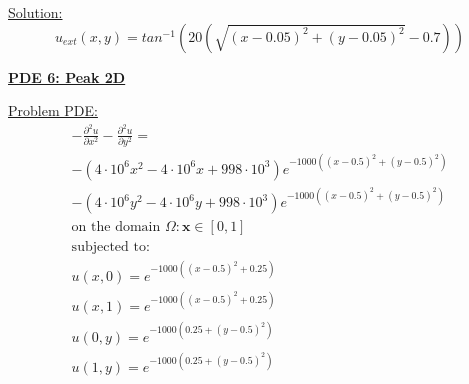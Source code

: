 \documentclass[.\jobname.tex]{subfiles}
\begin{document}
\underline{Solution:}
\begin{equation}
\label{eq:sol5}
u_{ext}(x,y) = tan^{-1}\left(20 \left(\sqrt{(x-0.05)^2 + (y-0.05)^2} -0.7\right)\right)
\end{equation}



\begin{figure}[H]
	\centering
	\noindent{}
	\label{fig:sol_plot_5}
\end{figure}




\newpage




\underline{\textbf{PDE 6: Peak 2D}} 

\underline{Problem PDE:}
\begin{equation}
\label{eq:pde6}
\begin{split}
-\frac{\partial^2 u}{\partial x^2} - \frac{\partial^2 u}{\partial y^2} = \\
-(4 \cdot 10^6 x^2 -4 \cdot 10^6 x + 998 \cdot 10^3)e^{-1000((x-0.5)^2 + (y-0.5)^2)} \\
-(4 \cdot 10^6 y^2 -4 \cdot 10^6 y + 998 \cdot 10^3)e^{-1000((x-0.5)^2 + (y-0.5)^2)} \\
\text{on the domain } \Omega: \mathbf{x} \in [0,1] \\
\text{subjected to: } \\
u(x,0) = e^{-1000((x-0.5)^{2} + 0.25)} \\
u(x,1) = e^{-1000((x-0.5)^{2} + 0.25)} \\
u(0,y) = e^{-1000(0.25 + (y-0.5)^{2})} \\
u(1,y) = e^{-1000(0.25 + (y-0.5)^{2})} \\
\end{split}
\end{equation}
\end{document}
